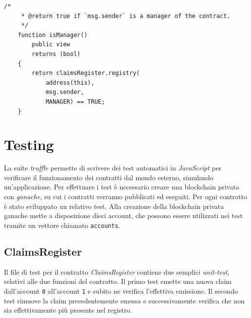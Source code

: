\noindent
\begin{lstlisting}[language=Solidity]
    /*
     * @return true if `msg.sender` is a manager of the contract.
     */
    function isManager()
        public view
        returns (bool)
    {
        return claimsRegister.registry(
            address(this),
            msg.sender,
            MANAGER) == TRUE;
    }
\end{lstlisting}

\section{Testing}
La suite \emph{truffle} permette di scrivere dei test automatici in \emph{JavaScript} per verificare il funzionamento dei contratti dal mondo esterno, simulando un'applicazione. Per effettuare i test è necessario creare una blockchain privata con \emph{ganache}, su cui i contratti verranno pubblicati ed eseguiti. Per ogni contratto è stato sviluppato un relativo test. Alla creazione della blockchain privata ganache mette a disposizione dieci account, che possono essere utilizzati nei test tramite un vettore chiamato \texttt{accounts}.

\subsection{ClaimsRegister}
Il file di test per il contratto \emph{ClaimsRegister} contiene due semplici \emph{unit-test}, relativi alle due funzioni del contratto. Il primo test emette una nuova claim dall'account \texttt{0} all'account \texttt{1} e subito ne verifica l'effettiva emissione. Il secondo test rimuove la claim precedentemente emessa e successivamente verifica che non sia effettivamente più presente nel registro.

